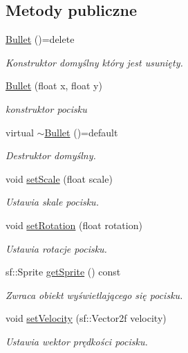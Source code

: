 \subsection*{Metody publiczne}
\begin{DoxyCompactItemize}
\item 
\mbox{\hyperlink{class_bullet_a5e8fd8844271779a2e6cf28a72b54da9}{Bullet}} ()=delete
\begin{DoxyCompactList}\small\item\em Konstruktor domyślny który jest usunięty. \end{DoxyCompactList}\item 
\mbox{\hyperlink{class_bullet_a9e0d7efa717b245dec0f436d5b3fe0c1}{Bullet}} (float x, float y)
\begin{DoxyCompactList}\small\item\em konstruktor pocisku \end{DoxyCompactList}\item 
virtual \mbox{\hyperlink{class_bullet_a051f364dc1951449fc0a3eb50537e681}{$\sim$\+Bullet}} ()=default
\begin{DoxyCompactList}\small\item\em Destruktor domyślny. \end{DoxyCompactList}\item 
void \mbox{\hyperlink{class_bullet_a34f6859e7b7e11fef77acbe8c58e84f8}{set\+Scale}} (float scale)
\begin{DoxyCompactList}\small\item\em Ustawia skale pocisku. \end{DoxyCompactList}\item 
void \mbox{\hyperlink{class_bullet_ad80b48a0ec4a81fad7e8fce823be2663}{set\+Rotation}} (float rotation)
\begin{DoxyCompactList}\small\item\em Ustawia rotacje pocisku. \end{DoxyCompactList}\item 
sf\+::\+Sprite \mbox{\hyperlink{class_bullet_a6808b8e55c477d41e24adc92d7726ad2}{get\+Sprite}} () const
\begin{DoxyCompactList}\small\item\em Zwraca obiekt wyświetlającego się pocisku. \end{DoxyCompactList}\item 
void \mbox{\hyperlink{class_bullet_a1a518fd30f6af391e54d6e4fe1382bf9}{set\+Velocity}} (sf\+::\+Vector2f velocity)
\begin{DoxyCompactList}\small\item\em Ustawia wektor prędkości pocisku. \end{DoxyCompactList}\item 

\end{DoxyCompactItemize}
